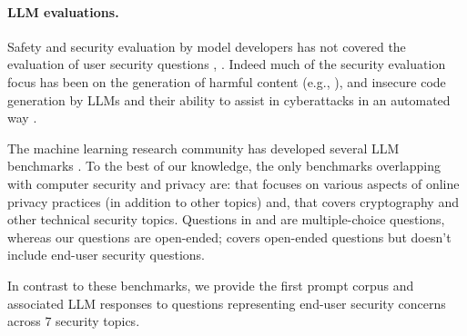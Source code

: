 \paragraph{LLM evaluations.} Safety and security evaluation by model developers has not covered the evaluation of user security questions \cite{openai2024gpt4, GPT4SystemCard}, \cite{geminiteam2024geminiv1.5, geminiteam2024geminiv1}. Indeed much of the security evaluation focus has been on the generation of harmful content (e.g., \cite{inan2023Llama}), and insecure code generation by LLMs and their ability to assist in cyberattacks in an automated way \cite{PurpleLlama, bhatt2023purple}.%

The machine learning research community has developed several LLM benchmarks \cite{chang-llms-eval-survey-2024}. To the best of our knowledge, the only benchmarks overlapping with computer security and privacy are: \cite{zhang-etal-2024-safetybench} that focuses on various aspects of online privacy practices (in addition to other topics) %
and, \cite{hendrycks2021measuring} that covers cryptography and other technical security topics.  
Questions in \cite{hendrycks2021measuring} and \cite{zhang-etal-2024-safetybench} are multiple-choice questions, whereas our questions are open-ended; \cite{mt-bench-zheng-2023} covers open-ended questions but doesn't include end-user security questions.



In contrast to these benchmarks, we provide the first prompt corpus and associated LLM responses to questions representing end-user security concerns across 7 security topics.




 











